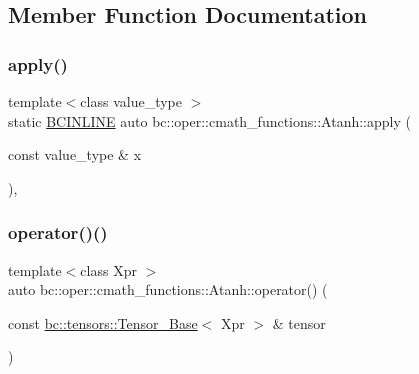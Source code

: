 \subsection{Member Function Documentation}
\mbox{\label{structbc_1_1oper_1_1cmath__functions_1_1Atanh_a863d6d8418c2073776d4c85e5516ede4}} 
\subsubsection{\texorpdfstring{apply()}{apply()}}
{\footnotesize\ttfamily template$<$class value\+\_\+type $>$ \\
static \hyperlink{common_8h_a6699e8b0449da5c0fafb878e59c1d4b1}{B\+C\+I\+N\+L\+I\+NE} auto bc\+::oper\+::cmath\+\_\+functions\+::\+Atanh\+::apply (\begin{DoxyParamCaption}\item[{const value\+\_\+type \&}]{x }\end{DoxyParamCaption})\hspace{0.3cm}{\ttfamily [inline]}, {\ttfamily [static]}}

\mbox{\label{structbc_1_1oper_1_1cmath__functions_1_1Atanh_a54634c8570f9e603628ad005899d6391}} 
\subsubsection{\texorpdfstring{operator()()}{operator()()}\hspace{0.1cm}{\footnotesize\ttfamily [1/3]}}
{\footnotesize\ttfamily template$<$class Xpr $>$ \\
auto bc\+::oper\+::cmath\+\_\+functions\+::\+Atanh\+::operator() (\begin{DoxyParamCaption}\item[{const \hyperlink{classbc_1_1tensors_1_1Tensor__Base}{bc\+::tensors\+::\+Tensor\+\_\+\+Base}$<$ Xpr $>$ \&}]{tensor }\end{DoxyParamCaption})\hspace{0.3cm}{\ttfamily [inline]}}

